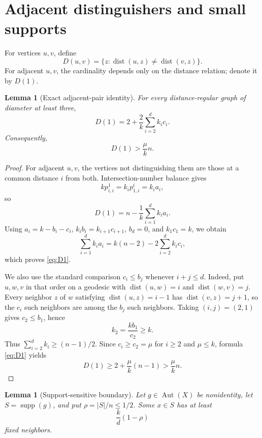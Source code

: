 \documentclass[11pt]{amsart}
\newtheorem{lemma}[theorem]{Lemma}
\theoremstyle{definition}
\newcommand{\supp}{\operatorname{supp}}
\newcommand{\dist}{\operatorname{dist}}
\newcommand{\Aut}{\operatorname{Aut}}
\begin{document}
\section{Adjacent distinguishers and small supports}
For vertices $u,v$, define
\[
 D(u,v)=\{z:\dist(u,z)\ne\dist(v,z)\}.
\]
For adjacent $u,v$, the cardinality depends only on the distance relation; denote it by $D(1)$.

\begin{lemma}[Exact adjacent-pair identity]\label{lem:D1}
For every distance-regular graph of diameter at least three,
\begin{equation}\label{eq:D1}
 D(1)=2+\frac2k\sum_{i=2}^{d}k_i c_i.
\end{equation}
Consequently,
\begin{equation}\label{eq:D1mu}
 D(1)>\frac{\mu}{k}n.
\end{equation}
\end{lemma}

\begin{proof}
For adjacent $u,v$, the vertices not distinguishing them are those at a common distance $i$ from both.  Intersection-number balance gives
\[
 k p^1_{i,i}=k_i p^i_{1,i}=k_i a_i,
\]
so
\[
 D(1)=n-\frac1k\sum_{i=1}^{d}k_i a_i.
\]
Using $a_i=k-b_i-c_i$, $k_i b_i=k_{i+1}c_{i+1}$, $b_d=0$, and $k_1c_1=k$, we obtain
\[
 \sum_{i=1}^{d}k_i a_i=k(n-2)-2\sum_{i=2}^{d}k_i c_i,
\]
which proves \eqref{eq:D1}.

We also use the standard comparison $c_i\le b_j$ whenever $i+j\le d$.  Indeed, put $u,w,v$ in that order on a geodesic with $\dist(u,w)=i$ and $\dist(w,v)=j$.  Every neighbor $z$ of $w$ satisfying $\dist(u,z)=i-1$ has $\dist(v,z)=j+1$, so the $c_i$ such neighbors are among the $b_j$ such neighbors.  Taking $(i,j)=(2,1)$ gives $c_2\le b_1$, hence
\[
 k_2=\frac{kb_1}{c_2}\ge k.
\]
Thus $\sum_{i=2}^{d}k_i\ge(n-1)/2$.  Since $c_i\ge c_2=\mu$ for $i\ge2$ and $\mu\le k$, formula \eqref{eq:D1} yields
\[
 D(1)\ge2+\frac{\mu}{k}(n-1)>\frac{\mu}{k}n.
\]
\end{proof}

\begin{lemma}[Support-sensitive boundary]\label{lem:boundary}
Let $g\in\Aut(X)$ be nonidentity, let $S=\supp(g)$, and put $\rho=|S|/n\le1/2$.  Some $x\in S$ has at least
\begin{equation}\label{eq:fixedneighbors}
 \frac{k}{d}(1-\rho)
\end{equation}
fixed neighbors.
\end{lemma}
\end{document}
